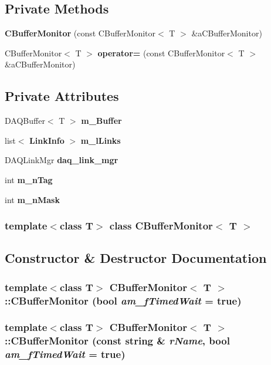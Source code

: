 \subsection*{Private Methods}
\begin{CompactItemize}
\item 
{\bf CBuffer\-Monitor} (const CBuffer\-Monitor$<$ T $>$ \&a\-CBuffer\-Monitor)
\item 
CBuffer\-Monitor$<$ T $>$ {\bf operator=} (const CBuffer\-Monitor$<$ T $>$ \&a\-CBuffer\-Monitor)
\end{CompactItemize}
\subsection*{Private Attributes}
\begin{CompactItemize}
\item 
DAQBuffer$<$ T $>$ {\bf m\_\-Buffer}
\item 
list$<$ {\bf Link\-Info} $>$ {\bf m\_\-l\-Links}
\item 
DAQLink\-Mgr {\bf daq\_\-link\_\-mgr}
\item 
int {\bf m\_\-n\-Tag}
\item 
int {\bf m\_\-n\-Mask}
\end{CompactItemize}
\subsubsection*{template$<$class T$>$ class CBuffer\-Monitor$<$ T $>$}



\subsection{Constructor \& Destructor Documentation}
\subsubsection{\setlength{\rightskip}{0pt plus 5cm}template$<$class T$>$ CBuffer\-Monitor$<$ T $>$::CBuffer\-Monitor (bool {\em am\_\-f\-Timed\-Wait} = true)\hspace{0.3cm}{\tt  [inline]}}\label{classCBufferMonitor_a0}


\subsubsection{\setlength{\rightskip}{0pt plus 5cm}template$<$class T$>$ CBuffer\-Monitor$<$ T $>$::CBuffer\-Monitor (const string \& {\em r\-Name}, bool {\em am\_\-f\-Timed\-Wait} = true)\hspace{0.3cm}{\tt  [inline]}}\label{classCBufferMonitor_a1}


